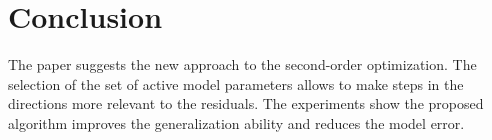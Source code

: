 \documentclass[a4paper,12pt]{article}
\theoremstyle{plain} %
\theoremstyle{definition} %
\theoremstyle{remark} %
\begin{document}
	\section*{Conclusion}
	The paper suggests the new approach to the second-order optimization. 
	The selection of the set of active model parameters allows to make steps in the directions more relevant to the residuals.
	The experiments show the proposed algorithm improves the generalization ability and reduces the model error.
  
  
  
	
\end{document}
